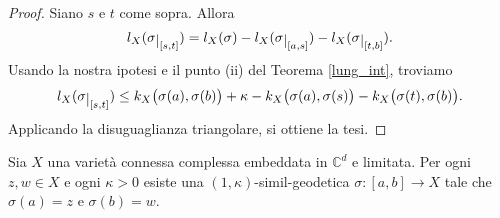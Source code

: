 \begin{proof}
    Siano $s$ e $t$ come sopra. Allora
    $$l_X(\sigma\restrict{[s,t]})=l_X(\sigma)-l_X(\sigma\restrict{[a,s]})-l_X(\sigma\restrict{[t,b]}).$$
    Usando la nostra ipotesi e il punto (ii) del Teorema \ref{lung_int}, troviamo
    $$l_X(\sigma\restrict{[s,t]}) \le k_X\big(\sigma(a),\sigma(b)\big)+\kappa-k_X\big(\sigma(a),\sigma(s)\big)-k_X\big(\sigma(t),\sigma(b)\big).$$
    Applicando la disuguaglianza triangolare, si ottiene la tesi.
\end{proof}

\begin{thm} \label{similgeo_conn}
    Sia $X$ una varietà connessa complessa embeddata in $\mathbb{C}^d$ e limitata. Per ogni $z,w \in X$ e ogni $\kappa>0$ esiste una $(1,\kappa)$-simil-geodetica $\sigma:[a,b]\longrightarrow X$ tale che $\sigma(a)=z$ e $\sigma(b)=w$.
\end{thm}

